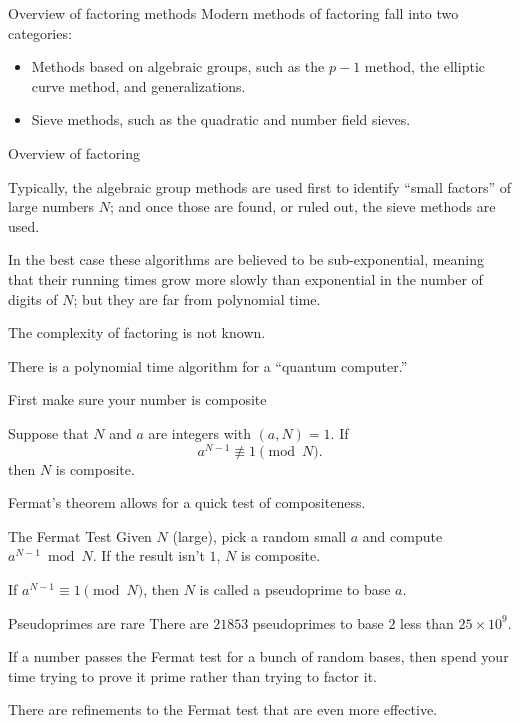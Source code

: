\documentclass{beamer}
\begin{document}
\begin{frame}{Overview of factoring methods}
	Modern methods of factoring fall into two categories:
	\begin{itemize}
		\item Methods based on algebraic groups, such as the $p-1$ method, the elliptic curve method, and generalizations.
		\item Sieve methods, such as the quadratic and number field sieves.
	\end{itemize}
\end{frame}
\begin{frame}{Overview of factoring}

	Typically, the algebraic group methods are used first to identify ``small
	factors'' of large numbers $N$; and once those are found, or ruled out, the
	sieve methods are used.

\bigskip\noindent In the best case these algorithms are believed to be
	sub-exponential, meaning that their running times grow more slowly than
	exponential in the number of digits of $N$; but they are far from polynomial
	time.

\bigskip\noindent
	The complexity of factoring is not known.  
	
\bigskip\noindent 
	There is a polynomial time algorithm for a ``quantum computer.''
\end{frame}
\begin{frame}{First make sure your number is composite}
	\begin{theorem}[Fermat] Suppose that $N$ and $a$ are integers with $(a,N)=1$.  If 
		$$a^{N-1}\not\equiv 1\pmod{N}.$$
	then $N$ is composite.
	\end{theorem}

	Fermat's theorem allows for a quick test of compositeness.  
	
	\begin{block}{The Fermat Test}
	Given $N$ (large), pick a random small $a$ and compute $a^{N-1}\bmod{N}$.
	If the result isn't $1$, $N$ is composite. 
	\end{block}

	\begin{definition}
	If $a^{N-1}\equiv 1\pmod{N}$, then $N$ is called a pseudoprime to base $a$.
	\end{definition}
\end{frame}
\begin{frame}{Pseudoprimes are rare}
	There are $21853$ pseudoprimes to base $2$ less than $25\times 10^{9}$.

	\bigskip\noindent
	If a number passes the Fermat test for a bunch of random bases, then spend your time trying to prove it prime
	rather than trying to factor it.

	\bigskip\noindent
	There are refinements to the Fermat test that are even more effective.

\end{frame}
\end{document}

